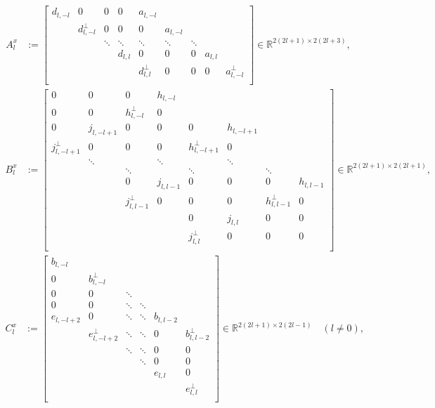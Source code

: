 \documentclass[11pt, oneside]{article}   	%
\newcommand{\R}{\mathbb{R}}
\begin{document}
\begin{align}
A^x_l &:= \begin{bmatrix}
		d_{l,-l} & 0 & 0 & 0 & a_{l,-l} & & \\
		& d^\perp_{l,-l} & 0 & 0 & 0 & a_{l,-l} & & \\
		& & \ddots & \ddots & \ddots & \ddots & \ddots & \\
		& & & d_{l,l} & 0 & 0 & 0 & a_{l,l} \\
		& & & & d^\perp_{l,l} & 0 & 0 & 0 & a^\perp_{l,-l}  \\
	    \end{bmatrix} \in \R^{2(2l+1)\times2(2l+3)}, 
\end{align}
\begin{align}
B^x_l &:= \begin{bmatrix}
		0 & 0 & 0 & h_{l,-l} & & \\
		0 & 0 & h^\perp_{l,-l} & 0 & & \\
		0 & j_{l,-l+1} & 0 & 0 & 0 & h_{l,-l+1} \\
		j^\perp_{l,-l+1} & 0 & 0 & 0 & h^\perp_{l,-l+1} & 0 \\
		& \ddots & & \ddots & & \ddots \\
		& & \ddots & & \ddots & & \ddots \\
		& & 0 & j_{l,l-1} & 0 & 0 & 0 & h_{l,l-1} \\
		& & j^\perp_{l,l-1} & 0 & 0 & 0 & h^\perp_{l,l-1} & 0 \\
		& & & & 0 & j_{l,l} & 0 & 0 \\
		& & & & j^\perp_{l,l} & 0 & 0 & 0 \\
	\end{bmatrix}  \in \R^{2(2l+1)\times2(2l+1)}, 
\end{align}
\begin{align}
C^x_l &:= \begin{bmatrix}
		b_{l,-l} & & \\
		0 & b^\perp_{l,-l} \\
		0 & 0 & \ddots & \\
		0 & 0 & \ddots & \ddots \\
		e_{l,-l+2} & 0 & \ddots & \ddots & b_{l,l-2} \\
		& e^\perp_{l,-l+2} & \ddots & \ddots & 0 & b^\perp_{l,l-2} \\
		& & \ddots & \ddots & 0 & 0 \\
		& & & \ddots & 0 & 0 \\
		& & & & e_{l,l} & 0 \\
		& & & & & e^\perp_{l,l} \\
	    \end{bmatrix} \in \R^{2(2l+1)\times2(2l-1)} \quad (l \ne 0),
\end{align}
\end{document}
